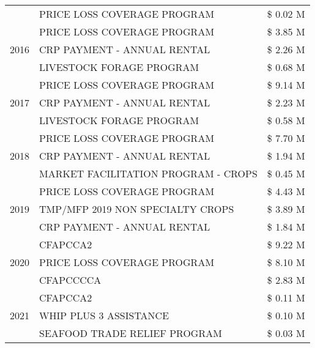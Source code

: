 \begin{tabular}{llr}
 & PRICE LOSS COVERAGE PROGRAM & \$ 0.02 M \\
\cline{1-3}
\multirow[t]{3}{*}{2016} & PRICE LOSS COVERAGE PROGRAM & \$ 3.85 M \\
 & CRP PAYMENT - ANNUAL RENTAL & \$ 2.26 M \\
 & LIVESTOCK FORAGE PROGRAM & \$ 0.68 M \\
\cline{1-3}
\multirow[t]{3}{*}{2017} & PRICE LOSS COVERAGE PROGRAM & \$ 9.14 M \\
 & CRP PAYMENT - ANNUAL RENTAL & \$ 2.23 M \\
 & LIVESTOCK FORAGE PROGRAM & \$ 0.58 M \\
\cline{1-3}
\multirow[t]{3}{*}{2018} & PRICE LOSS COVERAGE PROGRAM & \$ 7.70 M \\
 & CRP PAYMENT - ANNUAL RENTAL & \$ 1.94 M \\
 & MARKET FACILITATION PROGRAM - CROPS & \$ 0.45 M \\
\cline{1-3}
\multirow[t]{3}{*}{2019} & PRICE LOSS COVERAGE PROGRAM & \$ 4.43 M \\
 & TMP/MFP 2019 NON SPECIALTY CROPS & \$ 3.89 M \\
 & CRP PAYMENT - ANNUAL RENTAL & \$ 1.84 M \\
\cline{1-3}
\multirow[t]{3}{*}{2020} & CFAPCCA2 & \$ 9.22 M \\
 & PRICE LOSS COVERAGE PROGRAM & \$ 8.10 M \\
 & CFAPCCCCA & \$ 2.83 M \\
\cline{1-3}
\multirow[t]{3}{*}{2021} & CFAPCCA2 & \$ 0.11 M \\
 & WHIP PLUS 3 ASSISTANCE & \$ 0.10 M \\
 & SEAFOOD TRADE RELIEF PROGRAM & \$ 0.03 M \\
\cline{1-3}
\bottomrule
\end{tabular}
